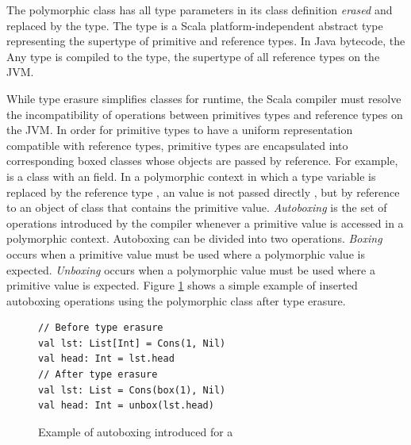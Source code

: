 The polymorphic  class has all type parameters in its class definition \textit{erased} and replaced by the  type.
The  type is a Scala platform-independent\cite{scala:overview} abstract type representing the supertype of primitive and reference types.
In Java bytecode, the {Any} type is compiled to the  type, the supertype of all reference types on the JVM.

While type erasure simplifies classes for runtime, the Scala compiler must resolve the incompatibility of operations between primitives types and reference types on the JVM\cite{java:vm-spec}.
In order for primitive types to have a uniform representation compatible with reference types, primitive types are encapsulated into corresponding boxed classes whose objects are passed by reference.
For example,  is a class with an  field.
In a polymorphic context in which a type variable is replaced by the reference type , an  value is not passed directly , but by reference to an object of class  that contains the primitive value.
\textit{Autoboxing}\cite{java:autoboxing} is the set of operations introduced by the compiler whenever a primitive value is accessed in a polymorphic context. 
Autoboxing can be divided into two operations.
\textit{Boxing} occurs when a primitive value must be used where a polymorphic value is expected.
\textit{Unboxing} occurs when a polymorphic value must be used where a primitive value is expected.
Figure \ref{example:autoboxing} shows a simple example of inserted autoboxing operations using the polymorphic  class after type erasure.

\begin{figure}[!htb]
\begin{verbatim}
// Before type erasure 	
val lst: List[Int] = Cons(1, Nil)
val head: Int = lst.head
// After type erasure
val lst: List = Cons(box(1), Nil)
val head: Int = unbox(lst.head) 
\end{verbatim}
\caption{Example of autoboxing introduced for a }
\label{example:autoboxing}
\end{figure}

